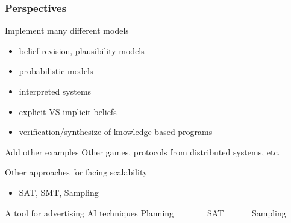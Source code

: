 



\begin{frame}
\frametitle{Perspectives}


\begin{block}{Implement many different models}
	\begin{itemize}
		\item belief revision, plausibility models
		\item probabilistic models
		\item interpreted systems
		\item explicit VS implicit beliefs
		\item verification/synthesize of knowledge-based programs
	\end{itemize}
\end{block}

\vfill

\begin{block}{Add other examples}
Other games, protocols from distributed systems, etc.
\end{block}

\vfill

\begin{block}{Other approaches for facing scalability}
	\begin{itemize}
		\item SAT, SMT, Sampling
	\end{itemize}
\end{block}

\begin{block}{A tool for advertising AI techniques}
Planning~~~~~~~~SAT~~~~~~	Sampling
\end{block}
\end{frame}













